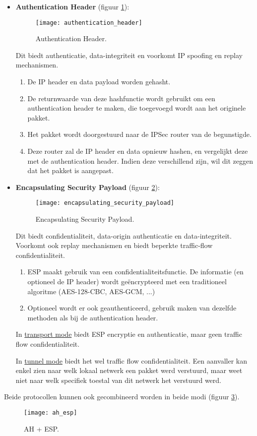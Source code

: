 \documentclass{report}
\begin{document}
	\begin{itemize}
		\item \textbf{Authentication Header} (figuur \ref{fig:authentication_header}): 
		\begin{figure}[ht]
			\texttt{[image: authentication\_header]}
			\caption{Authentication Header.}
			\label{fig:authentication_header}
		\end{figure}
		Dit biedt authenticatie, data-integriteit en voorkomt IP spoofing en replay mechanismen.
		\begin{enumerate}
			\item De IP header en data payload worden gehasht.
			\item De returnwaarde van deze hashfunctie wordt gebruikt om een authentication header te maken, die toegevoegd wordt aan het originele pakket.
			\item Het pakket wordt doorgestuurd naar de IPSec router van de begunstigde.
			\item Deze router zal de IP header en data opnieuw hashen, en vergelijkt deze met de authentication header. Indien deze verschillend zijn, wil dit zeggen dat het pakket is aangepast.
		\end{enumerate}
		\item \textbf{Encapsulating Security Payload} (figuur \ref{fig:encapsulating_security_payload}): 
		\begin{figure}[ht]
			\texttt{[image: encapsulating\_security\_payload]}
			\caption{Encapsulating Security Payload.}
			\label{fig:encapsulating_security_payload}
		\end{figure}
		Dit biedt confidentialiteit, data-origin authenticatie en data-integriteit. Voorkomt ook replay mechanismen en biedt beperkte traffic-flow confidentialiteit.
		\begin{enumerate}
			\item ESP maakt gebruik van een confidentialiteitsfunctie. De informatie (en optioneel de IP header) wordt geëncrypteerd met een traditioneel algoritme (AES-128-CBC, AES-GCM, ...)
			\item Optioneel wordt er ook geauthenticeerd, gebruik maken van dezelfde methoden als bij de authentication header.
		\end{enumerate}

		In \underline{transport mode} biedt ESP encryptie en authenticatie, maar geen traffic flow confidentialiteit.

		In \underline{tunnel mode} biedt het wel traffic flow confidentialiteit. Een aanvaller kan enkel zien naar welk lokaal netwerk een pakket werd verstuurd, maar weet niet naar welk specifiek toestal van dit netwerk het verstuurd werd.
		
	\end{itemize}
	Beide protocollen kunnen ook gecombineerd worden in beide modi (figuur \ref{fig:ah_esp}).
	\begin{figure}[ht]
		\texttt{[image: ah\_esp]}
		\caption{AH + ESP.}
		\label{fig:ah_esp}
	\end{figure}
\end{document}
